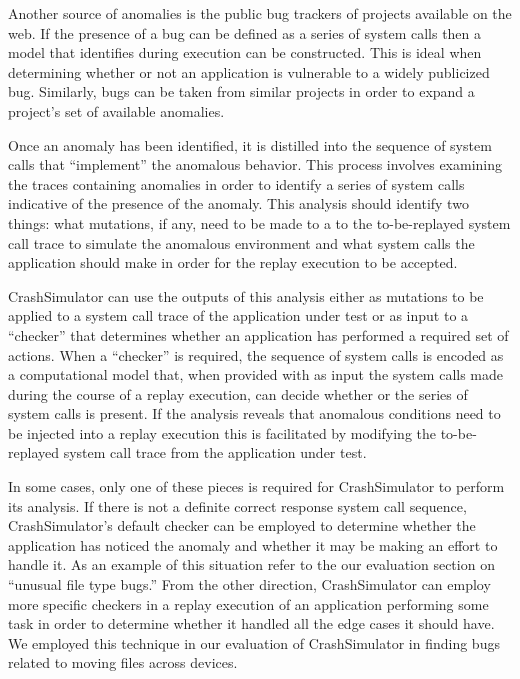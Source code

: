     Another source of anomalies is the public bug trackers of projects available
    on the web.  If the presence of a bug can be defined as a series of system
    calls then a model that identifies during execution can be constructed. This
    is ideal when determining whether or not an application is vulnerable to a
    widely publicized bug.  Similarly, bugs can be taken from similar projects
    in order to expand a project's set of available anomalies.

    Once an anomaly has been identified, it is distilled into the sequence of
    system calls that ``implement'' the anomalous behavior.  This process
    involves examining the traces containing anomalies in order to identify a
    series of system calls indicative of the presence of the anomaly.  This
    analysis should identify two things: what mutations, if any, need to be made
    to a to the to-be-replayed system call trace to simulate the anomalous
    environment and what system calls the application should make in order for
    the replay execution to be accepted.

    CrashSimulator can use the outputs of this analysis either as mutations to
    be applied to a system call trace of the application under test or as input
    to a ``checker'' that determines whether an application has performed a
    required set of actions. When a ``checker'' is required, the sequence of
    system calls is encoded as a computational model that, when provided with as
    input the system calls made during the course of a replay execution, can
    decide whether or the series of system calls is present.  If the analysis
    reveals that anomalous conditions need to be injected into a replay
    execution this is facilitated by modifying the to-be-replayed system call
    trace from the application under test.

    In some cases, only one of these pieces is required for CrashSimulator to
    perform its analysis.  If there is not a definite correct response system
    call sequence, CrashSimulator's default checker can be employed to determine
    whether the application has noticed the anomaly and whether it may be making
    an effort to handle it.  As an example of this situation refer to the our
    evaluation section on ``unusual file type bugs.''  From the other direction,
    CrashSimulator can employ more specific checkers in a replay execution of an
    application performing some task in order to determine whether it handled
    all the edge cases it should have.  We employed this technique in our
    evaluation of CrashSimulator in finding bugs related to moving files across
    devices.


